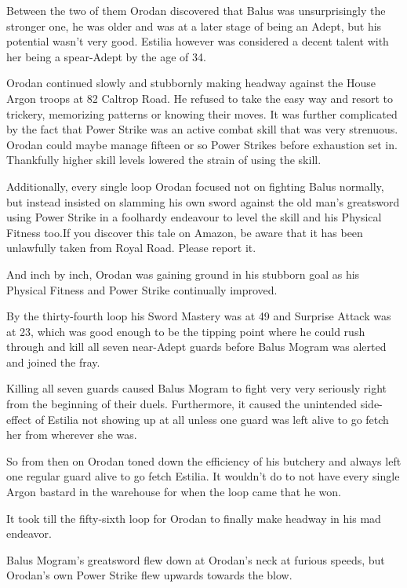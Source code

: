 \documentclass[a4paper,10pt]{book}
\begin{document}
Between the two of them Orodan discovered that Balus was unsurprisingly the stronger one, he was older and was at a later stage of being an Adept, but his potential wasn’t very good. Estilia however was considered a decent talent with her being a spear-Adept by the age of 34.\par
Orodan continued slowly and stubbornly making headway against the House Argon troops at 82 Caltrop Road. He refused to take the easy way and resort to trickery, memorizing patterns or knowing their moves. It was further complicated by the fact that Power Strike was an active combat skill that was very strenuous. Orodan could maybe manage fifteen or so Power Strikes before exhaustion set in. Thankfully higher skill levels lowered the strain of using the skill.\par
Additionally, every single loop Orodan focused not on fighting Balus normally, but instead insisted on slamming his own sword against the old man’s greatsword using Power Strike in a foolhardy endeavour to level the skill and his Physical Fitness too.If you discover this tale on Amazon, be aware that it has been unlawfully taken from Royal Road. Please report it.\par
And inch by inch, Orodan was gaining ground in his stubborn goal as his Physical Fitness and Power Strike continually improved.\par
By the thirty-fourth loop his Sword Mastery was at 49 and Surprise Attack was at 23, which was good enough to be the tipping point where he could rush through and kill all seven near-Adept guards before Balus Mogram was alerted and joined the fray.\par
Killing all seven guards caused Balus Mogram to fight very very seriously right from the beginning of their duels. Furthermore, it caused the unintended side-effect of Estilia not showing up at all unless one guard was left alive to go fetch her from wherever she was.\par
So from then on Orodan toned down the efficiency of his butchery and always left one regular guard alive to go fetch Estilia. It wouldn’t do to not have every single Argon bastard in the warehouse for when the loop came that he won.\par
It took till the fifty-sixth loop for Orodan to finally make headway in his mad endeavor.\par
Balus Mogram’s greatsword flew down at Orodan’s neck at furious speeds, but Orodan’s own Power Strike flew upwards towards the blow.\par
\end{document}
